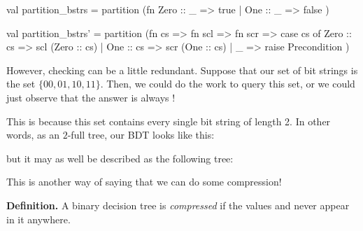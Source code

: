 \documentclass[addpoints,12pt, answers]{exam}
\begin{document}
\begin{questions}
\begin{parts}
    \begin{solutionorbox}[20em]
      \begin{codeblock}
        val partition_bstrs =
          partition
            (fn Zero :: _ => true
              | One  :: _ => false
            )

        val partition_bstrs' =
          partition
            (fn cs => fn scl => fn scr =>
              case cs of
                Zero :: cs => scl (Zero :: cs)
              | One :: cs => scr (One :: cs)
              | _ => raise Precondition
            )
      \end{codeblock}
    \end{solutionorbox}

  \begin{EnvUplevel}
    However, checking can be a little redundant. Suppose that our set of
    bit strings is the set $\{ 00, 01, 10, 11 \}$. Then,
    we could do the work to query this set, or we could
    just observe that the answer is always !

    This is because this set contains every single bit string of length
    2. In other words, as an $2$-full tree, our BDT looks like this:

    \begin{center}
    \end{center}

    but it may as well be described as the following tree:

    \vspace{10pt}

    \begin{center}
    \end{center}

    \vspace{10pt}

    This is another way of saying that we can do some compression!

    \textbf{Definition.} A binary decision tree  is
    \textit{compressed} if the values  and
     never appear in it anywhere.
  \end{EnvUplevel}




\end{parts}
\end{questions}
\end{document}
